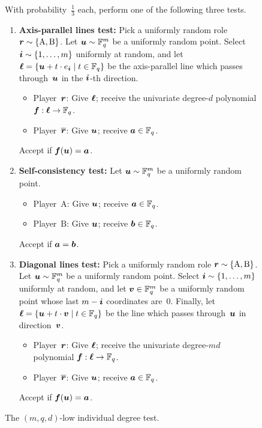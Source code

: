 {
\begin{figure}
With probability~$\tfrac{1}{3}$ each, perform one of the following three tests.
\begin{enumerate}
	\item \textbf{Axis-parallel lines test:}
		Pick a uniformly random role $\boldsymbol{r} \sim \{\mathrm{A},\mathrm{B}\}$.
		Let $\boldsymbol{u} \sim \mathbb F_q^m$ be a uniformly random point.
		Select $\boldsymbol{i} \sim \{1, \ldots, m\}$ uniformly at random,
		and let $\boldsymbol{\ell} = \{\boldsymbol{u} + t \cdot e_{\boldsymbol{i}} \mid t \in \mathbb F_q\}$
		be the axis-parallel line which passes through~$\boldsymbol{u}$ in the $\boldsymbol{i}$-th direction.
		\begin{itemize}
		\item[$\circ$] Player~$\boldsymbol{r}$: 
			Give $\boldsymbol{\ell}$;
			receive the univariate degree-$d$ polynomial $\boldsymbol{f}:\boldsymbol{\ell} \rightarrow \mathbb F_q$.
		\item[$\circ$] Player~$\overline{\boldsymbol{r}}$:
			Give $\boldsymbol{u}$;
			receive $\boldsymbol{a} \in \mathbb F_q$.
		\end{itemize}
		Accept if $\boldsymbol{f}(\boldsymbol{u}) = \boldsymbol{a}$.
	\item \textbf{Self-consistency test:}
		Let $\boldsymbol{u} \sim \mathbb F_q^m$ be a uniformly random point.
		\begin{itemize}
		\item[$\circ$] Player~$\mathrm{A}$: 
			Give $\boldsymbol{u}$;
			receive $\boldsymbol{a} \in \mathbb F_q$.
		\item[$\circ$] Player~$\mathrm{B}$:
			Give $\boldsymbol{u}$;
			receive $\boldsymbol{b} \in \mathbb F_q$.
		\end{itemize}
		Accept if $\boldsymbol{a} = \boldsymbol{b}$.
	\item \textbf{Diagonal lines test:}
		Pick a uniformly random role $\boldsymbol{r} \sim \{\mathrm{A},\mathrm{B}\}$.
		Let $\boldsymbol{u} \sim \mathbb F_q^m$ be a uniformly random point.
		Select $\boldsymbol{i} \sim \{1, \ldots, m\}$ uniformly at random,
		and let $\boldsymbol{v} \in \mathbb F_q^m$ be a uniformly random point whose last $m - \boldsymbol{i}$ coordinates are~$0$.
		Finally,
		let $\boldsymbol{\ell} = \{\boldsymbol{u} + t \cdot \boldsymbol{v} \mid t \in \mathbb F_q\}$
		be the line which passes through~$\boldsymbol{u}$ in direction~$\boldsymbol{v}$.
		\begin{itemize}
		\item[$\circ$] Player~$\boldsymbol{r}$: 
			Give $\boldsymbol{\ell}$;
			receive the univariate degree-$md$ polynomial $\boldsymbol{f}:\boldsymbol{\ell} \rightarrow \mathbb F_q$.
		\item[$\circ$] Player~$\overline{\boldsymbol{r}}$:
			Give $\boldsymbol{u}$;
			receive $\boldsymbol{a} \in \mathbb F_q$.
		\end{itemize}
		Accept if $\boldsymbol{f}(\boldsymbol{u}) = \boldsymbol{a}$.
	\end{enumerate}
	\caption{The $(m,q,d)$-low individual degree test.\label{fig:test}}
\end{figure}
}

